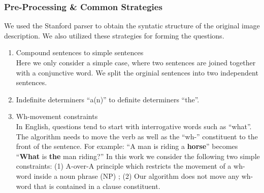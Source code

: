 \documentclass{article} %
\renewcommand{\#}[1]{\textbf{#1}}
\begin{document}
\subsubsection{Pre-Processing \& Common Strategies}
We used the Stanford parser \cite{klein03} to obtain the syntatic structure 
of the original image description. We also utilized these strategies for forming the questions.
\begin{enumerate}[leftmargin=*]
\item Compound sentences to simple sentences \\
Here we only consider a simple case, where two sentences are joined together 
with a conjunctive word. We split the orginial sentences into two independent sentences. 
\item Indefinite determiners ``a(n)'' to definite determiners ``the''.
\item Wh-movement constraints \\
In English, questions tend to start with interrogative words such as ``what''. 
The algorithm needs to move the verb as well as the ``wh-'' constituent to 
the front of the sentence. 
For example: ``A man is riding a \textbf{horse}'' becomes 
    ``\textbf{What} is \textbf{the} man riding?''
In this work we consider the following two simple 
constraints: (1) A-over-A principle which restricts the movement of a wh-word inside a noun phrase (NP) 
\cite{chomsky73}; (2) Our algorithm does not move any wh-word that is contained in a clause
constituent.
\end{enumerate}
\end{document}
